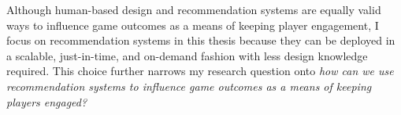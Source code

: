 
Although human-based design and recommendation systems are equally valid ways to influence game outcomes as a means of keeping player engagement, I focus on recommendation systems in this thesis because they can be deployed in a scalable, just-in-time, and on-demand fashion with less design knowledge required. This choice further narrows my research question onto \textit{how can we use recommendation systems to influence game outcomes as a means of keeping players engaged?}


